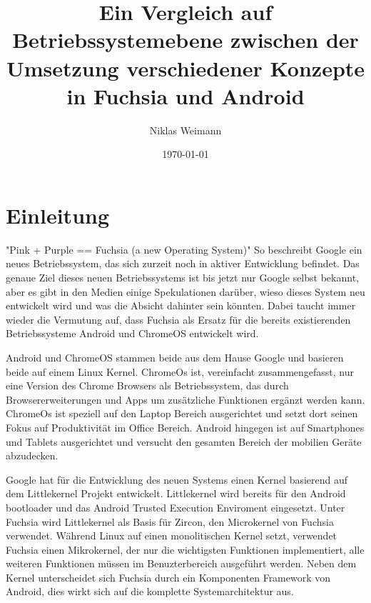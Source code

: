 \documentclass[a4paper]{scrartcl}
\begin{document}
\title{Ein Vergleich auf Betriebssystemebene zwischen der Umsetzung verschiedener Konzepte in Fuchsia und Android}
\author{Niklas Weimann}
\date{\today}

\maketitle
\tableofcontents
\newpage

\section{Einleitung}
"Pink + Purple == Fuchsia (a new Operating System)"\cite{fuchsia.Gettingstarted} So beschreibt Google ein neues Betriebssystem, das sich zurzeit noch in aktiver Entwicklung befindet. Das genaue Ziel dieses neuen Betriebssystems ist bis jetzt nur Google selbst bekannt, aber es gibt in den Medien einige Spekulationen darüber, wieso dieses System neu entwickelt wird und was die Absicht dahinter sein könnten. Dabei taucht immer wieder die Vermutung auf, dass Fuchsia als Ersatz für die bereits existierenden Betriebssysteme Android und ChromeOS entwickelt wird.

Android und ChromeOS stammen beide aus dem Hause Google und basieren beide auf einem Linux Kernel.  ChromeOs ist, vereinfacht zusammengefasst, nur eine Version des Chrome Browsers als Betriebssystem, das durch Browsererweiterungen und Apps um zusätzliche Funktionen ergänzt werden kann. ChromeOs ist speziell auf den Laptop Bereich ausgerichtet und setzt dort seinen Fokus auf Produktivität im Office Bereich. Android hingegen ist auf Smartphones und Tablets ausgerichtet und versucht den gesamten Bereich der mobilien Geräte abzudecken.

Google hat für die Entwicklung des neuen Systems einen Kernel basierend auf dem Littlekernel Projekt entwickelt. Littlekernel wird bereits für den Android bootloader \cite{Android.LittleKernel} und das Android Trusted Execution Enviroment \cite{Android.TrustyTee} eingesetzt. Unter Fuchsia wird Littlekernel als Basis für Zircon, den Microkernel von Fuchsia verwendet. Während Linux auf einen monolitischen Kernel setzt, verwendet Fuchsia einen Mikrokernel, der nur die wichtigsten Funktionen implementiert, alle weiteren Funktionen müssen im Benuzterbereich ausgeführt werden. Neben dem Kernel unterscheidet sich Fuchsia durch ein Komponenten Framework von Android, dies wirkt sich auf die komplette Systemarchitektur aus.
\end{document}
